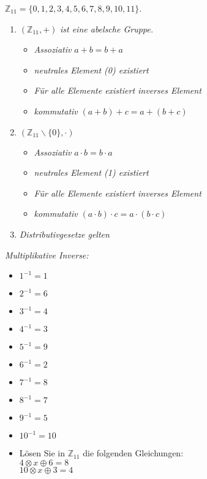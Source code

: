$\mathbb{Z}_{11} = \{0, 1, 2, 3, 4, 5, 6, 7, 8, 9, 10, 11\}$.
\begin{enumerate}[leftmargin=*]
	\item $(\mathbb{Z}_{11}, +)$ \textit{ist eine abelsche Gruppe.}
	\begin{itemize}
		\item \textit{Assoziativ} $a + b = b + a$
		\item \textit{neutrales Element (0) existiert}
		\item \textit{Für alle Elemente existiert inverses Element}
		\item \textit{kommutativ} $(a + b) + c = a + (b + c)$
	\end{itemize}
	\item $(\mathbb{Z}_{11} \backslash \{0\}, \cdot)$
		\begin{itemize}
		\item \textit{Assoziativ} $a \cdot b = b \cdot a$
		\item \textit{neutrales Element (1) existiert}
		\item \textit{Für alle Elemente existiert inverses Element}
		\item \textit{kommutativ} $(a \cdot b) \cdot c = a \cdot (b \cdot c)$
	\end{itemize}
	\item \textit{Distributivgesetze gelten}
\end{enumerate}

\newpage

\textit{Multiplikative Inverse:}

\begin{itemize}
	\item $1^{-1} = 1$
	\item $2^{-1} = 6$
	\item $3^{-1} = 4$
	\item $4^{-1} = 3$
	\item $5^{-1} = 9$
	\item $6^{-1} = 2$
	\item $7^{-1} = 8$
	\item $8^{-1} = 7$
	\item $9^{-1} = 5$
	\item $10^{-1} = 10$
\end{itemize}

\newpage

\begin{itemize}[leftmargin=*, label={d)}]
\item Lösen Sie in $\mathbb{Z}_{11}$ die folgenden Gleichungen:\\
$4 \otimes x \oplus 6 = 8$\\
$10 \otimes x \oplus 3 = 4$
\end{itemize}

